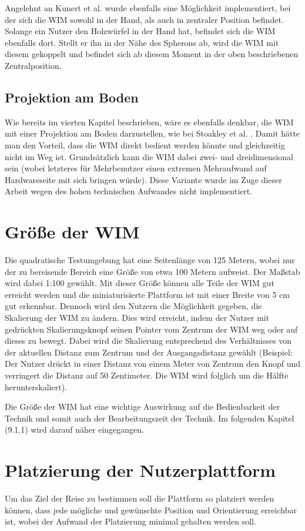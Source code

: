 Angelehnt an Kunert et al. \cite{Kunert2014Photoportals} wurde ebenfalls eine Möglichkeit implementiert, bei der sich die WIM sowohl in der Hand, als auch in zentraler Position befindet. Solange ein Nutzer den Holzwürfel in der Hand hat, befindet sich die WIM ebenfalls dort. Stellt er ihn in der Nähe des Spherons ab, wird die WIM mit diesem gekoppelt und befindet sich ab diesem Moment in der oben beschriebenen Zentralposition.

\subsection{Projektion am Boden}
Wie bereits im vierten Kapitel beschrieben, wäre es ebenfalls denkbar, die WIM mit einer Projektion am Boden darzustellen, wie bei Stoakley et al. \cite{Stoakley2010VirtualWIM}.
Damit hätte man den Vorteil, dass die WIM direkt bedient werden könnte und gleichzeitig nicht im Weg ist. Grundsätzlich kann die WIM dabei zwei- und dreidimensional sein (wobei letzteres für Mehrbenutzer einen extremen Mehraufwand auf Hardwareseite mit sich bringen würde). Diese Variante wurde im Zuge dieser Arbeit wegen des hohen technischen Aufwandes nicht implementiert.

\section{Größe der WIM}
Die quadratische Testumgebung hat eine Seitenlänge von 125 Metern, wobei nur der zu bereisende Bereich eine Größe von etwa 100 Metern aufweist.
Der Maßstab wird dabei 1:100 gewählt. Mit dieser Größe können alle Teile der WIM gut erreicht werden und die miniaturisierte Plattform ist mit einer Breite von 5 cm gut erkennbar. 
Dennoch wird den Nutzern die Möglichkeit gegeben, die Skalierung der WIM zu ändern. Dies wird erreicht, indem der Nutzer mit gedrückten Skalierungsknopf seinen Pointer vom Zentrum der WIM weg oder auf dieses zu bewegt. Dabei wird die Skalierung entsprechend des Verhältnisses von der aktuellen Distanz zum Zentrum und der Ausgangsdistanz gewählt (Beispiel: Der Nutzer drückt in einer Distanz von einem Meter von Zentrum den Knopf und verringert die Distanz auf 50 Zentimeter. Die WIM wird folglich um die Hälfte herunterskaliert).

Die Größe der WIM hat eine wichtige Auswirkung auf die Bedienbarkeit der Technik und somit auch der Bearbeitungszeit der Technik. Im folgenden Kapitel (9.1.1) wird darauf näher eingegangen.

\section{Platzierung der Nutzerplattform}
Um das Ziel der Reise zu bestimmen soll die Plattform so platziert werden können, dass jede mögliche und gewünschte Position und Orientierung erreichbar ist, wobei der Aufwand der Platzierung minimal gehalten werden soll.

